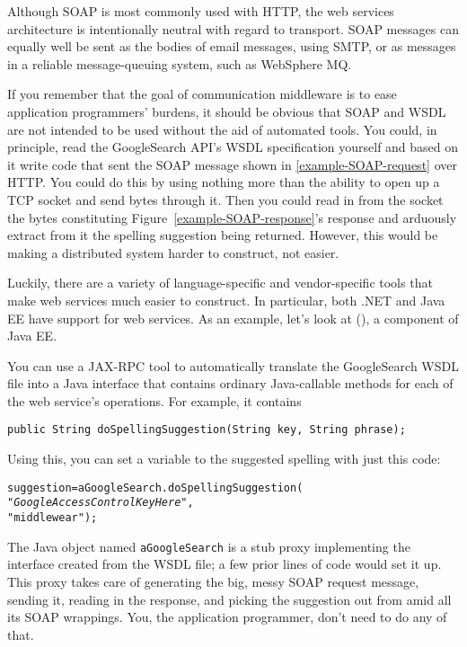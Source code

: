 Although SOAP is most commonly used with HTTP, the web services
architecture is intentionally neutral with regard to transport.  SOAP
messages can equally well be sent as the bodies of email messages,
using SMTP, or as messages in a reliable message-queuing system, such
as WebSphere MQ.

If you remember that the goal of communication middleware is to ease
application programmers' burdens, it should be obvious that SOAP and
WSDL are not intended to be used without the aid of automated tools.
You could, in principle, read the GoogleSearch API's WSDL specification
yourself and based on it write code that sent the SOAP message
shown in \ref{example-SOAP-request} over HTTP.  You could do this by using nothing more than
the ability to open up a TCP socket and send bytes through it. Then
you could read in from the socket the bytes constituting
Figure~\ref{example-SOAP-response}'s response and arduously extract
from it the spelling suggestion being returned.  However, this would
be making a distributed system harder to construct, not easier.

Luckily, there are a variety of language-specific and vendor-specific
tools that make web services much easier to construct.  In particular,
both .NET and Java EE have support for web services.  As an example, let's
look at  (), a component of
Java EE.

You can use a JAX-RPC
tool to automatically translate the
GoogleSearch WSDL file into a Java interface that contains
ordinary Java-callable methods for each of the web service's
operations.  For example, it contains
\begin{verbatim}
public String doSpellingSuggestion(String key, String phrase);
\end{verbatim}
Using this, you can set a variable to the suggested spelling with
just this code:
\begin{alltt}
suggestion = aGoogleSearch.doSpellingSuggestion(
                           "\textrm{\textit{GoogleAccessControlKeyHere}}",
                           "middlewear");
\end{alltt}
The Java object named \verb|aGoogleSearch| is a stub proxy
implementing the interface created from the WSDL file; a few prior
lines of code would set it up.  This proxy
takes care of generating the big, messy SOAP request message,
sending it, reading in the response, and picking the suggestion out
from amid all its SOAP wrappings.  You, the application programmer,
don't need to do any of that.

